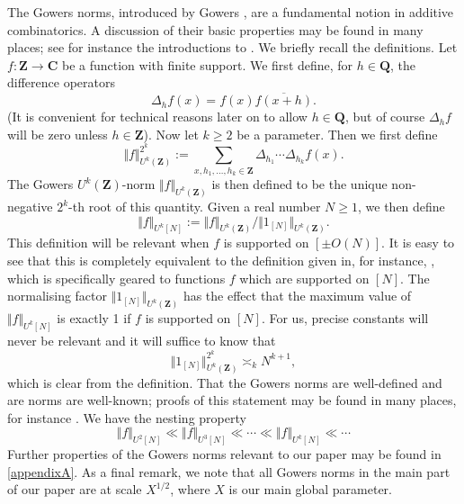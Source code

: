\documentclass[11pt,reqno]{amsart}
\numberwithin{equation}{section}
\theoremstyle{definition}
\theoremstyle{remark}
\renewcommand{\ge}{\geqslant}
\newcommand\Z{\mathbf{Z}}
\newcommand\Q{\mathbf{Q}}
\newcommand\C{\mathbf{C}}
\begin{document}
The Gowers norms, introduced by Gowers \cite{gowers-szemeredi}, are a fundamental notion in additive combinatorics. A discussion of their basic properties may be found in many places; see for instance the introductions to \cite{LSS,TT21}. We briefly recall the definitions. Let $f : \Z \rightarrow \C$ be a function with finite support. We first define, for $h \in \Q$, the difference operators
\begin{equation}\label{difference}\Delta_h f(x) = f(x)\overline{f(x+h)}.\end{equation} (It is convenient for technical reasons later on to allow $h \in \Q$, but of course $\Delta_h f$ will be zero unless $h \in \Z$). Now let $k \ge 2$ be a parameter. Then we first define
\begin{equation}\label{gowers-def} \Vert f \Vert^{2^k}_{U^k(\Z)} := \sum_{x, h_1, \dots, h_k \in \Z} \Delta_{h_1} \cdots\Delta_{h_k} f(x).\end{equation}
The Gowers $U^k(\Z)$-norm $\Vert f \Vert_{U^k(\Z)}$ is then defined to be the unique non-negative $2^k$-th root of this quantity. Given a real number $N \ge 1$, we then define 
\begin{equation}\label{gowers-norm-def-2} \Vert f \Vert_{U^k[N]} := \Vert f \Vert_{U^k(\Z)}/\Vert 1_{[N]} \Vert_{U^k(\Z)}.\end{equation}
This definition will be relevant when $f$ is supported on $[\pm O(N)]$. It is easy to see that this is completely equivalent to the definition given in, for instance, \cite[Definition 1.1]{LSS}, which is specifically geared to functions $f$ which are supported on $[N]$. The normalising factor $\Vert 1_{[N]} \Vert_{U^k(\Z)}$ has the effect that the maximum value of $\Vert f \Vert_{U^k[N]}$ is exactly 1 if $f$ is supported on $[N]$. For us, precise constants will never be relevant and it will suffice to know that 
\begin{equation}\label{normalisation-gowers-x} \Vert 1_{[N]} \Vert_{U^k(\Z)}^{2^k} \asymp_k N^{k+1},\end{equation} which is clear from the definition. That the Gowers norms are well-defined and are norms are well-known; proofs of this statement may be found in many places, for instance \cite[Appendix B.5]{green-tao-linear}. We have the nesting property
\begin{equation}\label{gowers-nesting} \Vert f \Vert_{U^2[N]} \ll \Vert f \Vert_{U^3[N]} \ll \cdots \ll \Vert f \Vert_{U^k[N]} \ll \cdots\end{equation}
Further properties of the Gowers norms relevant to our paper may be found in \cref{appendixA}. As a final remark, we note that all Gowers norms in the main part of our paper are at scale $X^{1/2}$, where $X$ is our main global parameter.
\end{document}

